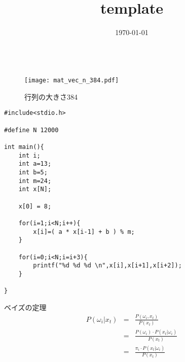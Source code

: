 \documentclass[a4paper,15pt,oneside,dvipdfmx,uplatex]{jsarticle}
\title{template}
\author{}
\date{\today}
\begin{document}
\maketitle


\begin{eqnarray}
\end{eqnarray}


\begin{figure}[H]
    \centering
    \texttt{[image: mat\_vec\_n\_384.pdf]}
    \captionsetup{labelformat=empty,labelsep=none}
    \caption{行列の大きさ384}
\end{figure}

\begin{lstlisting}[basicstyle=\ttfamily\footnotesize, frame=single]
#include<stdio.h>

#define N 12000

int main(){
    int i;
    int a=13;
    int b=5;
    int m=24;
    int x[N];

    x[0] = 8;

    for(i=1;i<N;i++){
        x[i]=( a * x[i-1] + b ) % m;
    }

    for(i=0;i<N;i=i+3){
        printf("%d %d %d \n",x[i],x[i+1],x[i+2]);
    }

}
\end{lstlisting}


\begin{itembox}[l]{ベイズの定理}
    \begin{eqnarray}
        \label{eq32}
        P( \omega _i | x_t) &=& \frac { P( \omega _i , x_t ) } {P(x_t)} \nonumber\\
         &=& \frac { P( \omega _i ) \cdot P(x_t| \omega _i)} {P(x_t)} \nonumber\\
                            &=& \frac { \pi _i  \cdot P(x_t| \omega _i)} {P(x_t)}
    \end{eqnarray}
\end{itembox}
\end{document}
